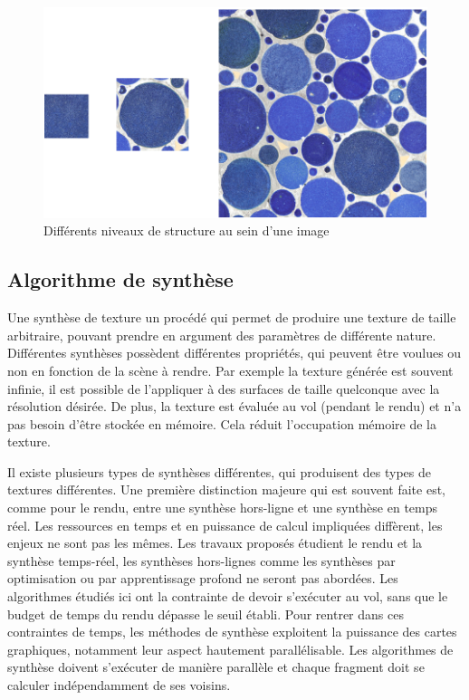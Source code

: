 \begin{figure}[ht!]
    \centering
    \includegraphics[width=.85\linewidth]{contenu/resources/images/structure_level}
    \caption{Différents niveaux de structure au sein d'une image}
    \label{fig:structure-level}
\end{figure}

\subsection{Algorithme de synthèse}

Une synthèse de texture un procédé qui permet de produire une texture de taille arbitraire, pouvant prendre en argument des paramètres de différente nature. Différentes synthèses possèdent différentes propriétés, qui peuvent être voulues ou non en fonction de la scène à rendre. Par exemple la texture générée est souvent infinie, il est possible de l'appliquer à des surfaces de taille quelconque avec la résolution désirée. De plus, la texture est évaluée au vol (pendant le rendu) et n'a pas besoin d'être stockée en mémoire. Cela réduit l'occupation mémoire de la texture.

\bigskip

Il existe plusieurs types de synthèses différentes, qui produisent des types de textures différentes. Une première distinction majeure qui est souvent faite est, comme pour le rendu, entre une synthèse hors-ligne et une synthèse en temps réel. Les ressources en temps et en puissance de calcul impliquées diffèrent, les enjeux ne sont pas les mêmes. Les travaux proposés étudient le rendu et la synthèse temps-réel, les synthèses hors-lignes comme les synthèses par optimisation ou par apprentissage profond ne seront pas abordées. Les algorithmes étudiés ici ont la contrainte de devoir s'exécuter au vol, sans que le budget de temps du rendu dépasse le seuil établi. Pour rentrer dans ces contraintes de temps, les méthodes de synthèse exploitent la puissance des cartes graphiques, notamment leur aspect hautement parallélisable. Les algorithmes de synthèse doivent s'exécuter de manière parallèle et chaque fragment doit se calculer indépendamment de ses voisins.

